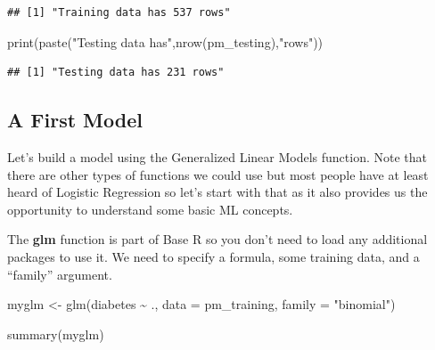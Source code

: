 \documentclass[
]{article}
\newenvironment{Shaded}{\begin{snugshade}}{\end{snugshade}}
\newcommand{\AttributeTok}[1]{\textcolor[rgb]{0.77,0.63,0.00}{#1}}
\newcommand{\FunctionTok}[1]{\textcolor[rgb]{0.00,0.00,0.00}{#1}}
\newcommand{\NormalTok}[1]{#1}
\newcommand{\OtherTok}[1]{\textcolor[rgb]{0.56,0.35,0.01}{#1}}
\newcommand{\SpecialCharTok}[1]{\textcolor[rgb]{0.00,0.00,0.00}{#1}}
\newcommand{\StringTok}[1]{\textcolor[rgb]{0.31,0.60,0.02}{#1}}
\begin{document}
\begin{Shaded}
\end{Shaded}

\begin{verbatim}
## [1] "Training data has 537 rows"
\end{verbatim}

\begin{Shaded}
\begin{Highlighting}[]
\FunctionTok{print}\NormalTok{(}\FunctionTok{paste}\NormalTok{(}\StringTok{"Testing data has"}\NormalTok{,}\FunctionTok{nrow}\NormalTok{(pm\_testing),}\StringTok{"rows"}\NormalTok{))}
\end{Highlighting}
\end{Shaded}

\begin{verbatim}
## [1] "Testing data has 231 rows"
\end{verbatim}

\hypertarget{a-first-model}{%
\subsection{A First Model}\label{a-first-model}}

Let's build a model using the Generalized Linear Models function. Note
that there are other types of functions we could use but most people
have at least heard of Logistic Regression so let's start with that as
it also provides us the opportunity to understand some basic ML
concepts.

The \textbf{glm} function is part of Base R so you don't need to load
any additional packages to use it. We need to specify a formula, some
training data, and a ``family'' argument.

\begin{Shaded}
\begin{Highlighting}[]
\NormalTok{myglm }\OtherTok{\textless{}{-}} \FunctionTok{glm}\NormalTok{(diabetes }\SpecialCharTok{\textasciitilde{}}\NormalTok{ .,}
             \AttributeTok{data =}\NormalTok{ pm\_training,}
             \AttributeTok{family =} \StringTok{"binomial"}\NormalTok{)}

\FunctionTok{summary}\NormalTok{(myglm)}
\end{Highlighting}
\end{Shaded}
\end{document}
